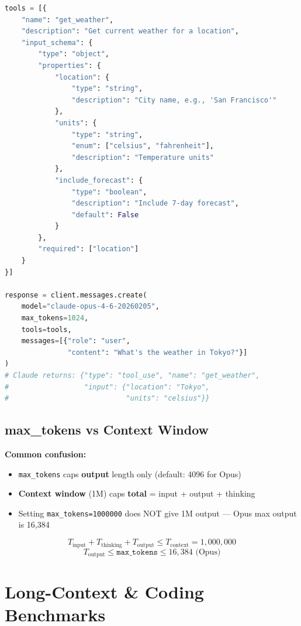 \documentclass[11pt,a4paper]{article}
\begin{document}
\begin{lstlisting}[language=Python, caption={Defining Tools with JSON Schema}]
tools = [{
    "name": "get_weather",
    "description": "Get current weather for a location",
    "input_schema": {
        "type": "object",
        "properties": {
            "location": {
                "type": "string",
                "description": "City name, e.g., 'San Francisco'"
            },
            "units": {
                "type": "string",
                "enum": ["celsius", "fahrenheit"],
                "description": "Temperature units"
            },
            "include_forecast": {
                "type": "boolean",
                "description": "Include 7-day forecast",
                "default": False
            }
        },
        "required": ["location"]
    }
}]

response = client.messages.create(
    model="claude-opus-4-6-20260205",
    max_tokens=1024,
    tools=tools,
    messages=[{"role": "user", 
               "content": "What's the weather in Tokyo?"}]
)
# Claude returns: {"type": "tool_use", "name": "get_weather",
#                  "input": {"location": "Tokyo", 
#                            "units": "celsius"}}
\end{lstlisting}

\subsection{max\_tokens vs Context Window}

\begin{tcolorbox}[colback=yellow!5, colframe=yellow!50!black]
\textbf{Common confusion:}
\begin{itemize}[itemsep=1pt]
  \item \texttt{max\_tokens} caps \textbf{output} length only (default: 4096 for Opus)
  \item \textbf{Context window} (1M) caps \textbf{total} = input + output + thinking
  \item Setting \texttt{max\_tokens=1000000} does NOT give 1M output --- Opus max output is 16,384
\end{itemize}
$$T_{\text{input}} + T_{\text{thinking}} + T_{\text{output}} \leq T_{\text{context}} = 1{,}000{,}000$$
$$T_{\text{output}} \leq \texttt{max\_tokens} \leq 16{,}384 \text{ (Opus)}$$
\end{tcolorbox}

\section{Long-Context \& Coding Benchmarks}
\end{document}
